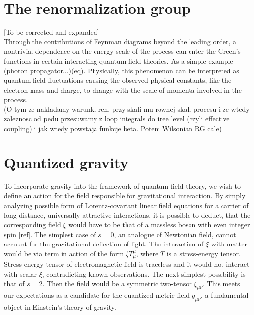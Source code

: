 \documentclass[11pt, a4paper]{article}
\begin{document}

\section{The renormalization group}
[To be corrected and expanded]\\
Through the contributions of Feynman diagrams beyond the leading order, a nontrivial dependence on the energy scale
of the process can enter the Green's functions in certain interacting quantum field theories. As a simple example
(photon propagator...)(eq). Physically, this phenomenon can be interpreted as quantum field fluctuations causing
the observed physical constants, like the electron mass and charge, to change with the scale of momenta involved
in the process.\\%

(O tym ze nakladamy warunki ren. przy skali mu rownej skali procesu i ze wtedy
zaleznosc od pedu przesuwamy z loop integrals do tree level (czyli effective coupling) i jak wtedy powstaja funkcje beta. Potem Wilsonian RG cale)


\section{Quantized gravity}

To incorporate gravity into the framework of quantum field theory, %
we wish to define an action for the field responsible for gravitational interaction.
By simply analyzing possible form of Lorentz-covariant linear field equations for a carrier of long-distance, 
universally attractive interactions, it is possible to deduct, that the corresponding field $\xi$ would have to be that of a massless boson with even integer spin [ref].
The simplest case of $s=0$, an analogue of Newtonian field, cannot account for the gravitational deflection of light.
The interaction of $\xi$ with matter would be via term in action of the form $\xi T^\mu_\mu$, where $T$ is a stress-energy tensor.
Stress-energy tensor of electromagnetic field is traceless and it would not interact with scalar $\xi$, contradicting known observations.
The next simplest possibility is that of $s=2$. Then the field would be a symmetric two-tensor $\xi_{\mu\nu}$. This meets our expectations as a
candidate for the quantized metric field $g_{\mu\nu}$, a fundamental object in Einstein's theory of gravity.
\end{document}
